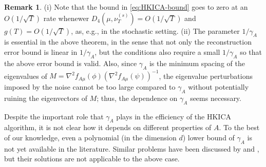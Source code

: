 \documentclass[jmlr]{article}
\theoremstyle{definition}
\newtheorem{remark}[lemma]{Remark}
\newcommand{\eps}{\epsilon}
\begin{document}
\fi
\begin{remark}
(i) Note that the bound in \eqref{eq:HKICA-bound} goes to zero at an $O(1/\sqrt{T})$ rate whenewer $D_4(\mu,\nu_T^{(s)})=O(1/\sqrt{T})$ and $g(T) =O(1/\sqrt{T}) $, as, e.g., in the stochastic setting.
(ii) The parameter $1/\gamma_A$ is essential in the above theorem, in the sense that not only the reconstruction error bound is linear in $1/\gamma_A$, but the conditions also require a small $1/\gamma_A$ so that the above error bound is valid. 
Also, since $\gamma_A$ is the minimum spacing of the eigenvalues of $M=\nabla^2 f_{A\mu}(\phi) (\nabla^2 f_{A\mu}(\psi))^{-1}$, the eigenvalue perturbations imposed by the noise cannot be too large compared to $\gamma_A$ without potentially  ruining the eigenvectors of $M$; thus, the dependence on $\gamma_A$ seems necessary.

\end{remark}

Despite the important role that $\gamma_A$ plays in the efficiency of the HKICA algorithm, it is not clear how it depends on different properties of $A$.
To the best of our knowledge, even a polynomial (in the dimension $d$) lower bound of $\gamma_A$ is not yet available in the literature. 
Similar problems have been discussed by  \citet{husler1987minimal} and \citet{goyal2014fourier}, but their solutions are not applicable to the above case.
\end{document}
